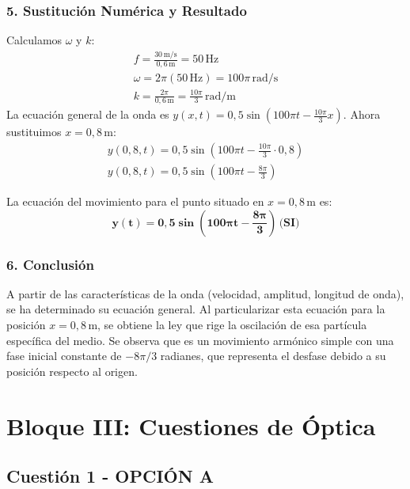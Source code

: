 \subsubsection*{5. Sustitución Numérica y Resultado}
Calculamos $\omega$ y $k$:
\begin{gather}
    f = \frac{30\,\text{m/s}}{0,6\,\text{m}} = 50\,\text{Hz} \\
    \omega = 2\pi (50\,\text{Hz}) = 100\pi\,\text{rad/s} \\
    k = \frac{2\pi}{0,6\,\text{m}} = \frac{10\pi}{3}\,\text{rad/m}
\end{gather}
La ecuación general de la onda es $y(x,t) = 0,5 \sin(100\pi t - \frac{10\pi}{3}x)$.
Ahora sustituimos $x=0,8\,\text{m}$:
\begin{gather}
    y(0,8, t) = 0,5 \sin\left(100\pi t - \frac{10\pi}{3} \cdot 0,8\right) \\
    y(0,8, t) = 0,5 \sin\left(100\pi t - \frac{8\pi}{3}\right)
\end{gather}
\begin{cajaresultado}
    La ecuación del movimiento para el punto situado en $x=0,8\,\text{m}$ es:
    $$ \boldsymbol{y(t) = 0,5 \sin\left(100\pi t - \frac{8\pi}{3}\right)} \,\textbf{(SI)} $$
\end{cajaresultado}

\subsubsection*{6. Conclusión}
\begin{cajaconclusion}
A partir de las características de la onda (velocidad, amplitud, longitud de onda), se ha determinado su ecuación general. Al particularizar esta ecuación para la posición $x=0,8\,\text{m}$, se obtiene la ley que rige la oscilación de esa partícula específica del medio. Se observa que es un movimiento armónico simple con una fase inicial constante de $-8\pi/3$ radianes, que representa el desfase debido a su posición respecto al origen.
\end{cajaconclusion}

\newpage

\section{Bloque III: Cuestiones de Óptica}
\label{sec:optica_2007_jun_ord}

\subsection{Cuestión 1 - OPCIÓN A}
\label{subsec:3A_2007_jun_ord}

